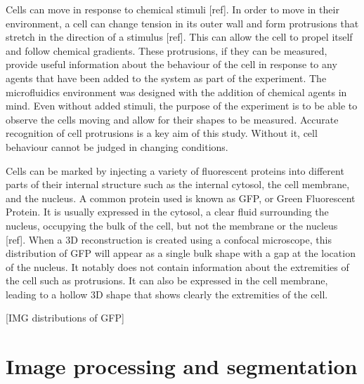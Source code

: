 Cells can move in response to chemical stimuli [ref]. In order to move in their environment, a cell can change tension in its outer wall and form protrusions that stretch in the direction of a stimulus [ref]. This can allow the cell to propel itself and follow chemical gradients. These protrusions, if they can be measured, provide useful information about the behaviour of the cell in response to any agents that have been added to the system as part of the experiment. The microfluidics environment was designed with the addition of chemical agents in mind. Even without added stimuli, the purpose of the experiment is to be able to observe the cells moving and allow for their shapes to be measured. Accurate recognition of cell protrusions is a key aim of this study. Without it, cell behaviour cannot be judged in changing conditions.

Cells can be marked by injecting a variety of fluorescent proteins into different parts of their internal structure such as the internal cytosol, the cell membrane, and the nucleus. A common protein used is known as GFP, or Green Fluorescent Protein. It is usually expressed in the cytosol, a clear fluid surrounding the nucleus, occupying the bulk of the cell, but not the membrane or the nucleus [ref]. When a 3D reconstruction is created using a confocal microscope, this distribution of GFP will appear as a single bulk shape with a gap at the location of the nucleus. It notably does not contain information about the extremities of the cell such as protrusions. It can also be expressed in the cell membrane, leading to a hollow 3D shape that shows clearly the extremities of the cell.

[IMG distributions of GFP]

\section{Image processing and segmentation}


